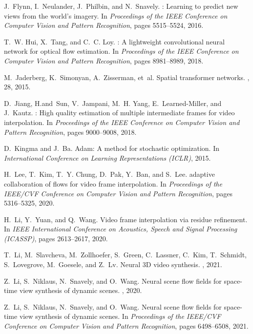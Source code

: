 \documentclass[12pt]{article}
\begin{document}
\begin{thebibliography}{10}
J.~Flynn, I.~Neulander, J.~Philbin, and N.~Snavely.
: Learning to predict new views from the world's imagery.
\newblock In {\em Proceedings of the IEEE Conference on Computer Vision and
  Pattern Recognition}, pages 5515--5524, 2016.

T.~W. Hui, X.~Tang, and C.~C. Loy.
: A lightweight convolutional neural network for optical
  flow estimation.
\newblock In {\em Proceedings of the IEEE Conference on Computer Vision and
  Pattern Recognition}, pages 8981--8989, 2018.

M.~Jaderberg, K.~Simonyan, A.~Zisserman, et~al.
\newblock Spatial transformer networks.
, 28, 2015.

D.~Jiang, H.and~Sun, V.~Jampani, M.~H. Yang, E.~Learned-Miller, and J.~Kautz.
: High quality estimation of multiple intermediate frames
  for video interpolation.
\newblock In {\em Proceedings of the IEEE Conference on Computer Vision and
  Pattern Recognition}, pages 9000--9008, 2018.

D.~Kingma and J.~Ba.
\newblock Adam: {A} method for stochastic optimization.
\newblock In {\em International Conference on Learning Representations (ICLR)},
  2015.

H.~Lee, T.~Kim, T.~Y. Chung, D.~Pak, Y.~Ban, and S.~Lee.
 adaptive collaboration of flows for video frame
  interpolation.
\newblock In {\em Proceedings of the IEEE/CVF Conference on Computer Vision and
  Pattern Recognition}, pages 5316--5325, 2020.

H.~Li, Y.~Yuan, and Q.~Wang.
\newblock Video frame interpolation via residue refinement.
\newblock In {\em IEEE International Conference on Acoustics, Speech and Signal
  Processing (ICASSP)}, pages 2613--2617, 2020.

T.~Li, M.~Slavcheva, M.~Zollhoefer, S.~Green, C.~Lassner, C.~Kim, T.~Schmidt,
  S.~Lovegrove, M.~Goesele, and Z.~Lv.
\newblock Neural {3D} video synthesis.
, 2021.

Z.~Li, S.~Niklaus, N.~Snavely, and O.~Wang.
\newblock Neural scene flow fields for space-time view synthesis of dynamic
  scenes.
, 2020.

Z.~Li, S.~Niklaus, N.~Snavely, and O.~Wang.
\newblock Neural scene flow fields for space-time view synthesis of dynamic
  scenes.
\newblock In {\em Proceedings of the IEEE/CVF Conference on Computer Vision and
  Pattern Recognition}, pages 6498--6508, 2021.


\end{thebibliography}
\end{document}
